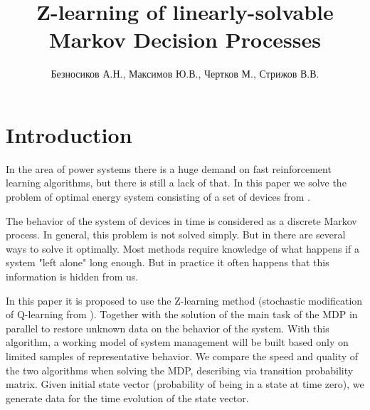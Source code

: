 \documentclass[12pt,twoside]{article}
\title
    [Z-learning of linearly-solvable Markov Decision Processes] %
    {Z-learning of linearly-solvable Markov Decision Processes}
\author
    [Безносиков А.Н.] %
    {Безносиков А.Н., Максимов Ю.В., Чертков М., Стрижов В.В.} %
    [Aleksandr Beznosikov$^1$, Yury Maximov, Michael Chertkov, Vadim Strijov]
\begin{document}
\maketitle

\section{Introduction} 

In the area of power systems there is a huge demand on fast reinforcement learning algorithms, but there is still a lack of that. In this paper we solve the problem of optimal energy system consisting of a set of devices from \cite{Chertkov}.

The behavior of the system of devices in time is considered as a discrete Markov process. In general, this problem is not solved simply. But in \cite{Todorov} there are several ways to solve it optimally. Most methods require knowledge of what happens if a system "left alone" long enough. But in practice it often happens that this information is hidden from us.

In this paper it is proposed to use the Z-learning method (stochastic modification of Q-learning from \cite{Szepesvari,Allen}). Together with the solution of the main task of the MDP in parallel to restore unknown data on the behavior of the system. With this algorithm, a working model of system management will be built based only on limited samples of representative behavior. We compare the speed and quality of the two algorithms when solving the MDP, describing via transition probability matrix. Given initial state vector (probability of being in a state at time zero), we generate data for the time evolution of the state vector. 





\end{document}
